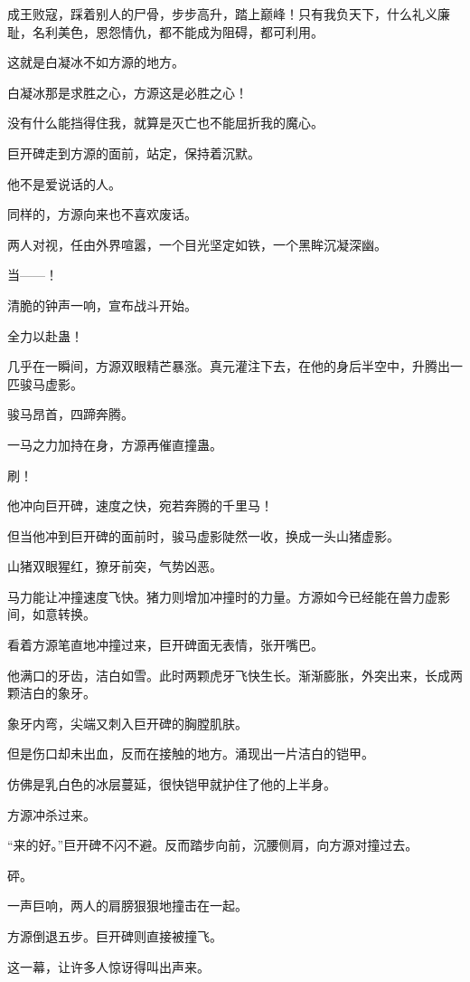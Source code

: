 \begin{this_body}
成王败寇，踩着别人的尸骨，步步高升，踏上巅峰！只有我负天下，什么礼义廉耻，名利美色，恩怨情仇，都不能成为阻碍，都可利用。

这就是白凝冰不如方源的地方。

白凝冰那是求胜之心，方源这是必胜之心！

没有什么能挡得住我，就算是灭亡也不能屈折我的魔心。

巨开碑走到方源的面前，站定，保持着沉默。

他不是爱说话的人。

同样的，方源向来也不喜欢废话。

两人对视，任由外界喧嚣，一个目光坚定如铁，一个黑眸沉凝深幽。

当——！

清脆的钟声一响，宣布战斗开始。

全力以赴蛊！

几乎在一瞬间，方源双眼精芒暴涨。真元灌注下去，在他的身后半空中，升腾出一匹骏马虚影。

骏马昂首，四蹄奔腾。

一马之力加持在身，方源再催直撞蛊。

刷！

他冲向巨开碑，速度之快，宛若奔腾的千里马！

但当他冲到巨开碑的面前时，骏马虚影陡然一收，换成一头山猪虚影。

山猪双眼猩红，獠牙前突，气势凶恶。

马力能让冲撞速度飞快。猪力则增加冲撞时的力量。方源如今已经能在兽力虚影间，如意转换。

看着方源笔直地冲撞过来，巨开碑面无表情，张开嘴巴。

他满口的牙齿，洁白如雪。此时两颗虎牙飞快生长。渐渐膨胀，外突出来，长成两颗洁白的象牙。

象牙内弯，尖端又刺入巨开碑的胸膛肌肤。

但是伤口却未出血，反而在接触的地方。涌现出一片洁白的铠甲。

仿佛是乳白色的冰层蔓延，很快铠甲就护住了他的上半身。

方源冲杀过来。

“来的好。”巨开碑不闪不避。反而踏步向前，沉腰侧肩，向方源对撞过去。

砰。

一声巨响，两人的肩膀狠狠地撞击在一起。

方源倒退五步。巨开碑则直接被撞飞。

这一幕，让许多人惊讶得叫出声来。


\end{this_body}
